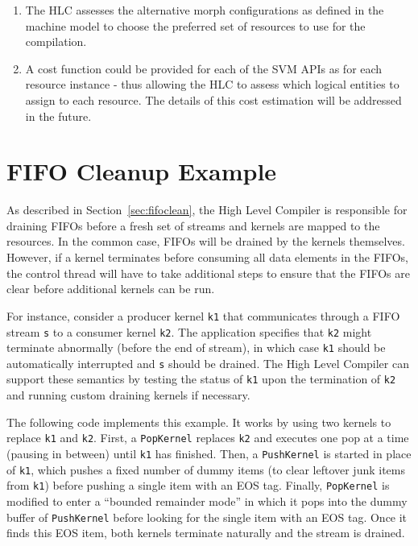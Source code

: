 \begin{enumerate}
\item The HLC assesses the alternative morph configurations as defined
in the machine model to choose the preferred set of resources to use
for the compilation.

\item A cost function could be provided for each of the SVM APIs as
for each resource instance - thus allowing the HLC to assess which
logical entities to assign to each resource.  The details of this cost
estimation will be addressed in the future.

\end{enumerate}

\appendix

\clearpage
\section{FIFO Cleanup Example}  %
\label{sec:fifocleanexample}
As described in Section~\ref{sec:fifoclean}, the High Level Compiler
is responsible for draining FIFOs before a fresh set of streams and
kernels are mapped to the resources.  In the common case, FIFOs will
be drained by the kernels themselves.  However, if a kernel terminates
before consuming all data elements in the FIFOs, the control thread
will have to take additional steps to ensure that the FIFOs are clear
before additional kernels can be run.

For instance, consider a producer kernel {\tt k1} that communicates
through a FIFO stream {\tt s} to a consumer kernel {\tt k2}.  The
application specifies that {\tt k2} might terminate abnormally (before
the end of stream), in which case {\tt k1} should be automatically
interrupted and {\tt s} should be drained.  The High Level Compiler
can support these semantics by testing the status of {\tt k1} upon the
termination of {\tt k2} and running custom draining kernels if
necessary.  

The following code implements this example.  It works by using two
kernels to replace {\tt k1} and {\tt k2}.  First, a {\tt PopKernel}
replaces {\tt k2} and executes one pop at a time (pausing in between)
until {\tt k1} has finished.  Then, a {\tt PushKernel} is started in
place of {\tt k1}, which pushes a fixed number of dummy items (to
clear leftover junk items from {\tt k1}) before pushing a single item
with an EOS tag.  Finally, {\tt PopKernel} is modified to enter a
``bounded remainder mode'' in which it pops into the dummy buffer of
{\tt PushKernel} before looking for the single item with an EOS tag.
Once it finds this EOS item, both kernels terminate naturally and the
stream is drained.

